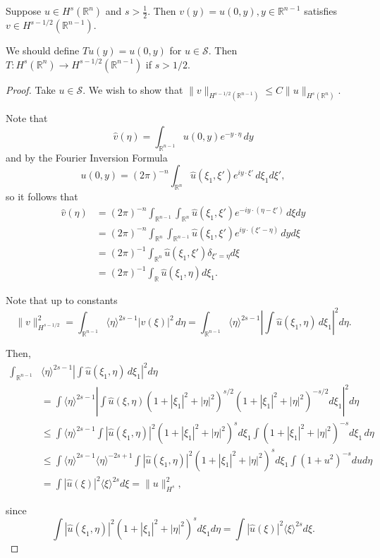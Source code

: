 \documentclass[12pt]{scrartcl}
\newcommand{\R}{\mathbb{R}}
\renewcommand{\hat}{\widehat}
\newcommand{\<}{\langle}
\renewcommand{\>}{\rangle}
\let \mc \mathcal
\begin{document}
\begin{thm} Suppose $u \in H^s(\R^n)$ and $s > \frac{1}{2}$.  Then $v(y) = u(0, y), y \in \R^{n-1}$ satisfies $v \in H^{s - 1/2} (\R^{n-1})$.
\end{thm}
\begin{remark} We should define $Tu(y) = u(0, y)$ for $u \in \mc S$.  Then $T: H^s(\R^n) \to H^{s - 1/2}(\R^{n-1})$ if $s > 1/2$.  
\end{remark}
\begin{proof}
Take $u \in \mc S$.  We wish to show that $\|v\|_{H^{s - 1/2}(\R^{n-1})} \le C\|u\|_{H^s(\R^n)}$.

Note that $$\hat{v}(\eta) = \int_{\R^{n-1}} u(0, y) e^{-y \cdot \eta} \,dy$$
and by the Fourier Inversion Formula
$$u(0, y) = (2\pi)^{-n}\int_{\R^n} \hat{u}(\xi_1, \xi') e^{iy \cdot \xi'}\,d\xi_1 d\xi',$$
so it follows that 
\begin{align*}
\hat{v}(\eta) &= (2\pi)^{-n}\int_{\R^{n-1}}\int_{\R^n} \hat{u}(\xi_1, \xi') e^{-iy \cdot (\eta - \xi')}\,d\xi dy \\
&= (2\pi)^{-n}\int_{\R^{n}}\int_{\R^{n-1}}\hat{u}(\xi_1, \xi') e^{iy \cdot (\xi' - \eta)}\, dy d\xi\\
&= (2\pi)^{-1} \int_{\R^n} \hat{u}(\xi_1, \xi') \delta_{\xi' = \eta}d\xi \\
&= (2\pi)^{-1} \int_{\R} \hat{u}(\xi_1, \eta) d\xi_1.
\end{align*}
 
Note that up to constants
 $$\|v\|_{H^{s-1/2}}^2 = \int_{\R^{n-1}} \<\eta\>^{2s-1} |\hat{v}(\xi)|^2\, d\eta = \int_{\R^{n-1}} \<\eta\>^{2s-1} \left |\int \hat{u}(\xi_1, \eta)\, d\xi_1\right |^2d\eta.$$
  
 Then,
 \begin{align*}
 \int_{\R^{n-1}} &\<\eta\>^{2s-1} \left |\int \hat{u}(\xi_1, \eta)\, d\xi_1\right |^2d\eta \\
 &= \int \<\eta\>^{2s-1} \left |\int \hat{u}(\xi, \eta)(1 + |\xi_1|^2 + |\eta|^2)^{s/2} (1 + |\xi_1|^2 + |\eta|^2)^{-s/2}d\xi_1  \right |^2d\eta \\
 & \le \int \<\eta\>^{2s-1} \int |\hat{u}(\xi_1, \eta)|^2 (1 + |\xi_1|^2 + |\eta|^2)^s d\xi_1 \int (1 + |\xi_1|^2 + |\eta|^2)^{-s} d\xi_1\, d\eta \\
&\le \int \<\eta\>^{2s-1} \<\eta\>^{-2s+1}  \int |\hat{u}(\xi_1, \eta)|^2 (1 + |\xi_1|^2 + |\eta|^2)^s d\xi_1\int (1 + u^2)^{-s} du d\eta\\
& = \int |\hat{u}(\xi)|^2 \<\xi\>^{2s} d\xi = \|u\|_{H^s}^2,
 \end{align*}
 
since
$$\int |\hat{u}(\xi_1, \eta)|^2 (1 + |\xi_1|^2 + |\eta|^2)^s d\xi_1d\eta = \int |\hat{u}(\xi)|^2 \<\xi\>^{2s}d\xi.$$

\end{proof}
\pagebreak
\end{document}
